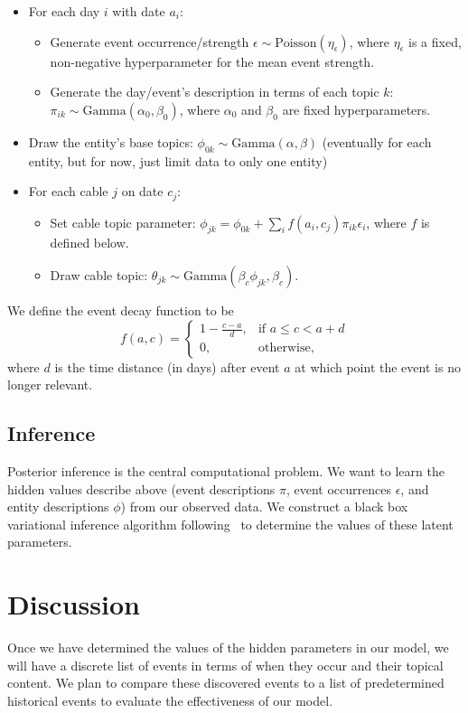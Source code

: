 \begin{itemize}
\item For each day $i$ with date $a_i$:
\begin{itemize}
\item Generate event occurrence/strength $\epsilon \sim \mbox{Poisson}
(\eta_\epsilon)$, where $\eta_\epsilon$ is a fixed, non-negative
hyperparameter for the mean event strength.
\item Generate the day/event's description in terms of each topic $k$: $\pi_{ik} \sim \mbox{Gamma}(\alpha_0, \beta_0)$, where $\alpha_0$ and $\beta_0$ are fixed hyperparameters.
\end{itemize}
\item Draw the entity's base topics: $\phi_{0k} \sim \mbox{Gamma}(\alpha, \beta)$ (eventually for each entity, but for now, just limit data to only one entity)
\item For each cable $j$ on date $c_j$:
\begin{itemize}
	\item Set cable topic parameter: $\phi_{jk} = \phi_{0k} + \sum_i f(a_i, c_j) \pi_{ik} \epsilon_i$, where $f$ is defined below.
	\item Draw cable topic: $\theta_{jk} \sim \mbox{Gamma}(\beta_c \phi_{jk}, \beta_c)$.
\end{itemize}
\end{itemize}

\noindent We define the event decay function to be \[f(a, c) =
\begin{cases}
	1 - \frac{c-a}{d}, & \mbox{if } a \le c < a+d \\
	0, & \mbox{otherwise,}
\end{cases} \]
where $d$ is the time distance (in days) after event $a$ at which point the event is no longer relevant.



\subsection{Inference}
Posterior inference is the central computational problem.  We want to learn the hidden values describe above (event descriptions $\pi$, event occurrences $\epsilon$, and entity descriptions $\phi$) from our observed data.  We construct a black box variational inference algorithm following~\citet{Ranganath:2014} to determine the values of these latent parameters.

\section{Discussion}
Once we have determined the values of the hidden parameters in our model, we will have a discrete list of events in terms of when they occur and their topical content.  We plan to compare these discovered events to a list of predetermined historical events to evaluate the effectiveness of our model.

